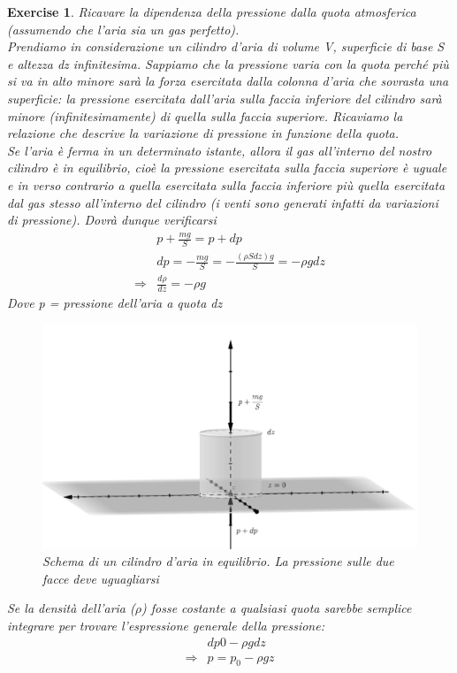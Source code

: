 \documentclass[10pt,a4paper]{article}
\newtheorem{exercise}{Exercise}
\begin{document}
\begin{exercise}
Ricavare la dipendenza della pressione dalla quota atmosferica (assumendo che l’aria sia un gas perfetto).\\
Prendiamo in considerazione un cilindro d'aria di volume V, superficie di base S e altezza dz infinitesima. Sappiamo che la pressione varia con la quota perché più si va in alto minore sarà la forza esercitata dalla colonna d'aria che sovrasta una superficie: la pressione esercitata dall'aria sulla faccia inferiore del cilindro sarà minore (infinitesimamente) di quella sulla faccia superiore. Ricaviamo la relazione che descrive la variazione di pressione in funzione della quota.\\
Se l'aria è ferma in un determinato istante, allora il gas all'interno del nostro cilindro è in equilibrio, cioè la pressione esercitata sulla faccia superiore è uguale e in verso contrario a quella esercitata sulla faccia inferiore più quella esercitata dal gas stesso all'interno del cilindro (i venti sono generati infatti da variazioni di pressione). Dovrà dunque verificarsi
\begin{align}\label{eq:stevin}
	&p + \frac{m g}{S} = p + dp \nonumber \\
	&dp = -\frac{m g}{S} = -\frac{(\rho S dz) g}{S}= -\rho g dz \nonumber \\
	\Rightarrow & \frac{d\rho}{dz}= - \rho g
\end{align} 
Dove p = pressione dell'aria a quota dz
\begin{figure}[h!]
	\centering
	\includegraphics[width=0.5\linewidth]{../images/cilindro_aria}
	\caption{Schema di un cilindro d'aria in equilibrio. La pressione sulle due facce deve uguagliarsi}
	\label{fig:cilindroaria}
\end{figure}
\FloatBarrier
Se la densità dell'aria ($\rho$) fosse costante a qualsiasi quota sarebbe semplice integrare per trovare l'espressione generale della pressione:
\begin{align*} 
	&dp 0 -\rho  g dz \\
	\Rightarrow & p = p_0 - \rho g z
\end{align*} 

\end{exercise}
\end{document}
